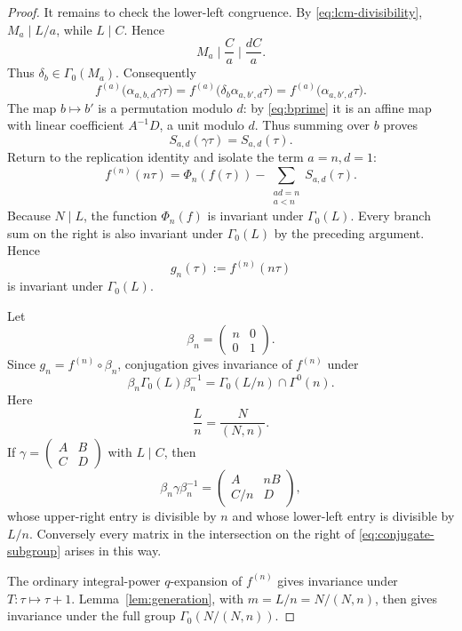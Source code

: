 \documentclass[10pt,a4paper]{amsart}
\newcommand{\C}{\mathbb C}
\begin{document}
\begin{proof}
It remains to check the lower-left congruence. By \eqref{eq:lcm-divisibility}, $M_a\mid L/a$, while $L\mid C$. Hence
\[
M_a\mid\frac{C}{a}\mid\frac{dC}{a}.
\]
Thus $\delta_b\in\Gamma_0(M_a)$. Consequently
\[
f^{(a)}\bigl(\alpha_{a,b,d}\gamma\tau\bigr)
=
f^{(a)}\bigl(\delta_b\alpha_{a,b',d}\tau\bigr)
=
f^{(a)}\bigl(\alpha_{a,b',d}\tau\bigr).
\]
The map $b\mapsto b'$ is a permutation modulo $d$: by \eqref{eq:bprime} it is an affine map with linear coefficient $A^{-1}D$, a unit modulo $d$. Thus summing over $b$ proves
\[
S_{a,d}(\gamma\tau)=S_{a,d}(\tau).
\]
Return to the replication identity and isolate the term $a=n,d=1$:
\begin{equation}\label{eq:isolate-n-descent}
f^{(n)}(n\tau)
=
\Phi_n(f(\tau))
-
\sum_{\substack{ad=n\\a<n}}S_{a,d}(\tau).
\end{equation}
Because $N\mid L$, the function $\Phi_n(f)$ is invariant under $\Gamma_0(L)$. Every branch sum on the right is also invariant under $\Gamma_0(L)$ by the preceding argument. Hence
\[
g_n(\tau):=f^{(n)}(n\tau)
\]
is invariant under $\Gamma_0(L)$.

Let
\[
\beta_n=\begin{pmatrix}n&0\\0&1\end{pmatrix}.
\]
Since $g_n=f^{(n)}\circ\beta_n$, conjugation gives invariance of $f^{(n)}$ under
\begin{equation}\label{eq:conjugate-subgroup}
\beta_n\Gamma_0(L)\beta_n^{-1}
=
\Gamma_0(L/n)\cap\Gamma^0(n).
\end{equation}
Here
\[
\frac{L}{n}=\frac{N}{(N,n)}.
\]
If $\gamma=\left(\begin{smallmatrix}A&B\\C&D\end{smallmatrix}\right)$ with $L\mid C$, then
\[
\beta_n\gamma\beta_n^{-1}
=
\begin{pmatrix}A&nB\\C/n&D\end{pmatrix},
\]
whose upper-right entry is divisible by $n$ and whose lower-left entry is divisible by $L/n$. Conversely every matrix in the intersection on the right of \eqref{eq:conjugate-subgroup} arises in this way.

The ordinary integral-power $q$-expansion of $f^{(n)}$ gives invariance under $T:\tau\mapsto\tau+1$. Lemma~\ref{lem:generation}, with $m=L/n=N/(N,n)$, then gives invariance under the full group $\Gamma_0(N/(N,n))$.
\end{proof}
\end{document}
